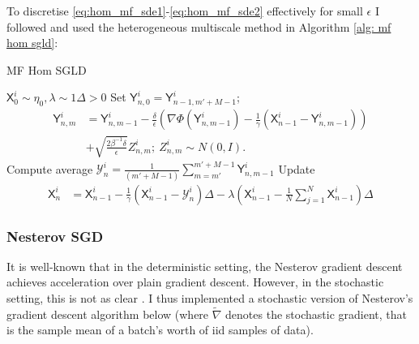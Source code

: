 \documentclass{article}
\theoremstyle{mystyle}
\begin{document}
To discretise \ref{eq:hom_mf_sde1}-\ref{eq:hom_mf_sde2} effectively
for small $\epsilon$ I followed \cite{kantas2019sharpflatshallowweakly} and used the heterogeneous multiscale method \cite{weinan2005multiscalesde} in Algorithm \ref{alg: mf hom sgld}:

\begin{examplesblock}{MF Hom SGLD}\label{alg: mf hom sgld}
\begin{algorithmic}
	\Require $\mathsf{X}_{0}^{i}\sim\eta_{0}, \lambda \sim 1 \Delta >0$ 
\State Set $\mathsf{Y}_{n,0}^{i}=\mathsf{Y}_{n-1,m'+M-1}^{i}$;
\State \[\begin{array}{ll}
	\mathsf{Y}_{n,m}^{i} &=\mathsf{Y}_{n,m-1}^{i}-\frac{\delta}{\epsilon}\left(\nabla\Phi(\mathsf{Y}_{n,m-1}^{i})-\frac{1}{\gamma}(\mathsf{X}_{n-1}^{i}-\mathsf{Y}_{n,m-1}^{i})\right)\\&+\sqrt{\frac{2\beta^{-1}\delta}{\epsilon}}Z_{n,m}^{i};\:Z_{n,m}^{i}\sim N(0,I).
\end{array}\]
\EndFor
\State Compute average $\mathcal{Y}_{n}^{i}=\frac{1}{(m'+M-1)}\displaystyle\sum_{m=m'}^{m'+M-1}\mathsf{Y}_{n,m-1}^{i}$
\State Update
 \State  
\begin{align*}
\mathsf{X}_{n}^{i} & =\mathsf{X}_{n-1}^{i}-\frac{1}{\gamma}(\mathsf{X}_{n-1}^{i}-\mathcal{Y}_{n}^{i})\Delta-\lambda\left(\mathsf{X}_{n-1}^{i}-\frac{1}{N}\displaystyle\sum_{j=1}^{N}\mathsf{X}_{n-1}^{i}\right)\Delta
\end{align*}
\EndFor 
\end{algorithmic}
\end{examplesblock}

\subsubsection{Nesterov SGD}

It is well-known that in the deterministic setting, the Nesterov gradient descent achieves acceleration over plain gradient descent. However, in the stochastic setting, this is not as clear \cite{liu2019acceleratingsgdmomentumoverparameterized} . I thus implemented a stochastic version of Nesterov's gradient descent algorithm below (where $ \tilde{\nabla}$ denotes the stochastic gradient, that is the sample mean of a batch's worth of iid samples of data).
\end{document}
